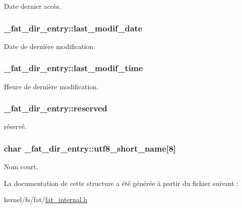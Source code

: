 Date dernier accès. \hypertarget{struct__fat__dir__entry_a9be27b92458730fbdf5342f717aadc32}{
\subsubsection[{last\+\_\+modif\+\_\+date}]{ \+\_\+fat\+\_\+dir\+\_\+entry\+::last\+\_\+modif\+\_\+date}}\label{struct__fat__dir__entry_a9be27b92458730fbdf5342f717aadc32}
Date de dernière modification. \hypertarget{struct__fat__dir__entry_a967f3fe06020a24a22bc83cb80637669}{
\subsubsection[{last\+\_\+modif\+\_\+time}]{ \+\_\+fat\+\_\+dir\+\_\+entry\+::last\+\_\+modif\+\_\+time}}\label{struct__fat__dir__entry_a967f3fe06020a24a22bc83cb80637669}
Heure de dernière modification. \hypertarget{struct__fat__dir__entry_a27e7962cefa12233338034dff3d75304}{
\subsubsection[{reserved}]{ \+\_\+fat\+\_\+dir\+\_\+entry\+::reserved}}\label{struct__fat__dir__entry_a27e7962cefa12233338034dff3d75304}
réservé. \hypertarget{struct__fat__dir__entry_abb18201b12e6039275e6dad91c19a99d}{
\subsubsection[{utf8\+\_\+short\+\_\+name}]{\setlength{\rightskip}{0pt plus 5cm}char \+\_\+fat\+\_\+dir\+\_\+entry\+::utf8\+\_\+short\+\_\+name\mbox{[}8\mbox{]}}}\label{struct__fat__dir__entry_abb18201b12e6039275e6dad91c19a99d}
Nom court. 

La documentation de cette structure a été générée à partir du fichier suivant \+:\begin{DoxyCompactItemize}
\item 
kernel/fs/fat/\hyperlink{fat__internal_8h}{fat\+\_\+internal.\+h}\end{DoxyCompactItemize}
